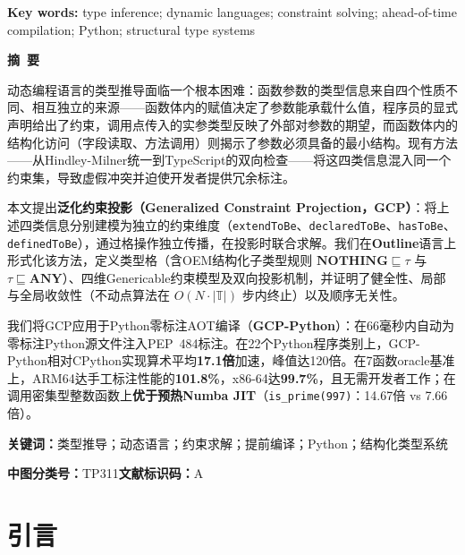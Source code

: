 \documentclass[UTF8]{article}
\newcommand{\NOTHING}{\mathbf{NOTHING}}
\newcommand{\ANY}{\mathbf{ANY}}
\begin{document}
\medskip\noindent
\textbf{Key words:} type inference; dynamic languages; constraint solving; ahead-of-time compilation; Python; structural type systems

\bigskip

\begin{center}
  \textbf{摘\ 要}
\end{center}

\noindent
动态编程语言的类型推导面临一个根本困难：函数参数的类型信息来自四个性质不同、相互独立的来源——函数体内的赋值决定了参数能承载什么值，程序员的显式声明给出了约束，调用点传入的实参类型反映了外部对参数的期望，而函数体内的结构化访问（字段读取、方法调用）则揭示了参数必须具备的最小结构。现有方法——从Hindley-Milner统一到TypeScript的双向检查——将这四类信息混入同一个约束集，导致虚假冲突并迫使开发者提供冗余标注。

本文提出\textbf{泛化约束投影（Generalized Constraint Projection，GCP）}：将上述四类信息分别建模为独立的约束维度（\texttt{extendToBe}、\texttt{declaredToBe}、\texttt{hasToBe}、\texttt{definedToBe}），通过格操作独立传播，在投影时联合求解。我们在\textbf{Outline}语言上形式化该方法，定义类型格（含OEM结构化子类型规则 $\NOTHING \sqsubseteq \tau$ 与 $\tau \sqsubseteq \ANY$）、四维Genericable约束模型及双向投影机制，并证明了健全性、局部与全局收敛性（不动点算法在 $O(N \cdot |\mathbb{T}|)$ 步内终止）以及顺序无关性。

我们将GCP应用于Python零标注AOT编译（\textbf{GCP-Python}）：在66毫秒内自动为零标注Python源文件注入PEP~484标注。在22个Python程序类别上，GCP-Python相对CPython实现算术平均\textbf{17.1倍}加速，峰值达120倍。在7函数oracle基准上，ARM64达手工标注性能的\textbf{101.8\%}，x86-64达\textbf{99.7\%}，且无需开发者工作；在调用密集型整数函数上\textbf{优于预热Numba JIT}（\texttt{is\_prime(997)}：14.67倍 vs 7.66倍）。

\medskip\noindent
\textbf{关键词：}类型推导；动态语言；约束求解；提前编译；Python；结构化类型系统

\medskip\noindent
\textbf{中图分类号：}TP311\quad \textbf{文献标识码：}A

\section{引言}
\label{sec:intro}
\end{document}
